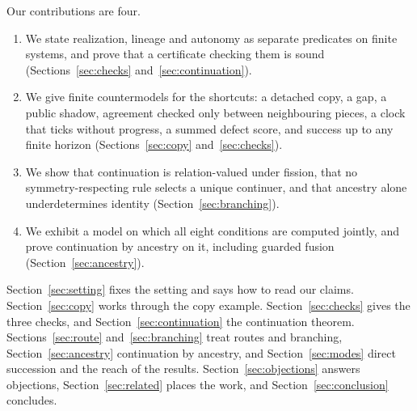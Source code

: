 Our contributions are four.
\begin{enumerate}
\item We state realization, lineage and autonomy as separate predicates on
finite systems, and prove that a certificate checking them is sound
(Sections~\ref{sec:checks} and~\ref{sec:continuation}).
\item We give finite countermodels for the shortcuts: a detached copy, a gap,
a public shadow, agreement checked only between neighbouring pieces, a clock that ticks without
progress, a summed defect score, and success up to any finite horizon
(Sections~\ref{sec:copy} and~\ref{sec:checks}).
\item We show that continuation is relation-valued under fission, that no
symmetry-respecting rule selects a unique continuer, and that ancestry alone
underdetermines identity (Section~\ref{sec:branching}).
\item We exhibit a model on which all eight conditions are computed jointly,
and prove continuation by ancestry on it, including guarded fusion
(Section~\ref{sec:ancestry}).
\end{enumerate}

Section~\ref{sec:setting} fixes the setting and says how to read our claims.
Section~\ref{sec:copy} works through the copy example.
Section~\ref{sec:checks} gives the three checks, and
Section~\ref{sec:continuation} the continuation theorem.
Sections~\ref{sec:route} and~\ref{sec:branching} treat routes and branching,
Section~\ref{sec:ancestry} continuation by ancestry, and
Section~\ref{sec:modes} direct succession and the reach of the results.
Section~\ref{sec:objections} answers objections,
Section~\ref{sec:related} places the work, and
Section~\ref{sec:conclusion} concludes.
